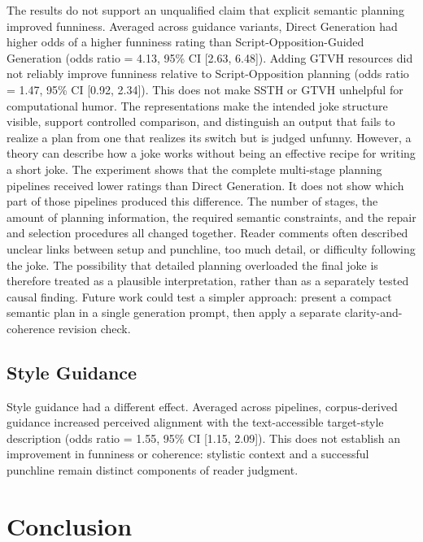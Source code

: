 \documentclass[11pt]{article}
\begin{document}
The results do not support an unqualified claim that explicit semantic planning improved funniness. Averaged across guidance variants, Direct Generation had higher odds of a higher funniness rating than Script-Opposition-Guided Generation (odds ratio = 4.13, 95\% CI {[}2.63, 6.48{]}). Adding GTVH resources did not reliably improve funniness relative to Script-Opposition planning (odds ratio = 1.47, 95\% CI {[}0.92, 2.34{]}). This does not make SSTH or GTVH unhelpful for computational humor. The representations make the intended joke structure visible, support controlled comparison, and distinguish an output that fails to realize a plan from one that realizes its switch but is judged unfunny. However, a theory can describe how a joke works without being an effective recipe for writing a short joke. The experiment shows that the complete multi-stage planning pipelines received lower ratings than Direct Generation. It does not show which part of those pipelines produced this difference. The number of stages, the amount of planning information, the required semantic constraints, and the repair and selection procedures all changed together. Reader comments often described unclear links between setup and punchline, too much detail, or difficulty following the joke. The possibility that detailed planning overloaded the final joke is therefore treated as a plausible interpretation, rather than as a separately tested causal finding. Future work could test a simpler approach: present a compact semantic plan in a single generation prompt, then apply a separate clarity-and-coherence revision check.

\subsection{Style Guidance}\label{style-guidance}

Style guidance had a different effect. Averaged across pipelines, corpus-derived guidance increased perceived alignment with the text-accessible target-style description (odds ratio = 1.55, 95\% CI {[}1.15, 2.09{]}). This does not establish an improvement in funniness or coherence: stylistic context and a successful punchline remain distinct components of reader judgment.

\section{Conclusion}\label{conclusion}
\end{document}
